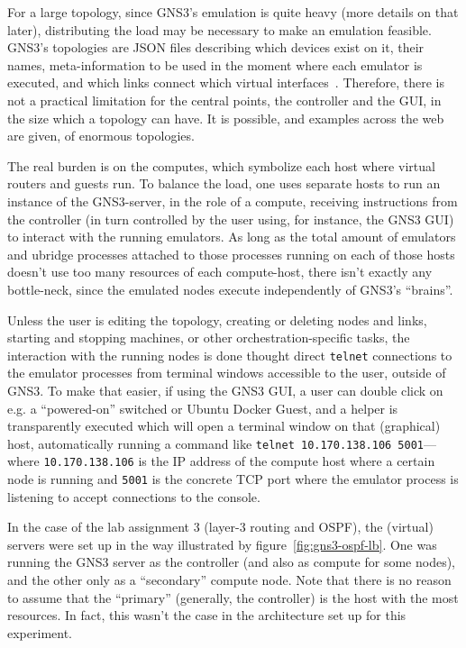 For a large topology, since GNS3's emulation is quite heavy (more details on that later), distributing the load may be necessary to make an emulation feasible.
GNS3's topologies are JSON files describing which devices exist on it, their names, meta-information to be used in the moment where each emulator is executed, and which links connect which virtual interfaces~\cite{thebookofgns3}.
Therefore, there is not a practical limitation for the central points, the controller and the GUI, in the size which a topology can have.
It is possible, and examples across the web are given, of enormous topologies.

The real burden is on the computes, which symbolize each host where virtual routers and guests run.
To balance the load, one uses separate hosts to run an instance of the GNS3-server, in the role of a compute, receiving instructions from the controller (in turn controlled by the user using, for instance, the GNS3 GUI) to interact with the running emulators.
As long as the total amount of emulators and ubridge processes attached to those processes running on each of those hosts doesn't use too many resources of each compute-host, there isn't exactly any bottle-neck, since the emulated nodes execute independently of GNS3's ``brains''.

Unless the user is editing the topology, creating or deleting nodes and links, starting and stopping machines, or other orchestration-specific tasks, the interaction with the running nodes is done thought direct \texttt{telnet} connections to the emulator processes from terminal windows accessible to the user, outside of GNS3.
To make that easier, if using the GNS3 GUI, a user can double click on e.g. a ``powered-on'' switched or Ubuntu Docker Guest, and a helper is transparently executed which will open a terminal window on that (graphical) host, automatically running a command like \texttt{telnet 10.170.138.106 5001}---where \texttt{10.170.138.106} is the IP address of the compute host where a certain node is running and \texttt{5001} is the concrete TCP port where the emulator process is listening to accept connections to the console.

In the case of the lab assignment 3 (layer-3 routing and OSPF), the (virtual) servers were set up in the way illustrated by figure~\ref{fig:gns3-ospf-lb}.
One was running the GNS3 server as the controller (and also as compute for some nodes), and the other only as a ``secondary'' compute node.
Note that there is no reason to assume that the ``primary'' (generally, the controller) is the host with the most resources.
In fact, this wasn't the case in the architecture set up for this experiment.



